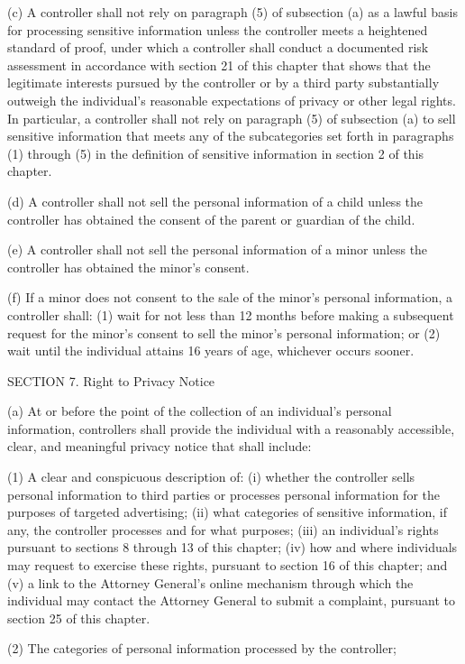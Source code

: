(c) A controller shall not rely on paragraph (5) of subsection (a) as a lawful basis for processing sensitive information unless the controller meets a heightened standard of proof, under which a controller shall conduct a documented risk assessment in accordance with section 21 of this chapter that shows that the legitimate interests pursued by the controller or by a third party substantially outweigh the individual’s reasonable expectations of privacy or other legal rights. In particular, a controller shall not rely on paragraph (5) of subsection (a) to sell sensitive information that meets any of the subcategories set forth in paragraphs (1) through (5) in the definition of sensitive information in section 2 of this chapter.  

(d) A controller shall not sell the personal information of a child unless the controller has obtained the consent of the parent or guardian of the child.

(e) A controller shall not sell the personal information of a minor unless the controller has obtained the minor’s consent.

(f) If a minor does not consent to the sale of the minor’s personal information, a controller shall: (1) wait for not less than 12 months before making a subsequent request for the minor’s consent to sell the minor’s personal information; or (2) wait until the individual attains 16 years of age, whichever occurs sooner.

SECTION 7. Right to Privacy Notice

(a) At or before the point of the collection of an individual’s personal information, controllers shall provide the individual with a reasonably accessible, clear, and meaningful privacy notice that shall include:

(1) A clear and conspicuous description of: (i) whether the controller sells personal information to third parties or processes personal information for the purposes of targeted advertising; (ii) what categories of sensitive information, if any, the controller processes and for what purposes; (iii) an individual’s rights pursuant to sections 8 through 13 of this chapter; (iv) how and where individuals may request to exercise these rights, pursuant to section 16 of this chapter; and (v) a link to the Attorney General’s online mechanism through which the individual may contact the Attorney General to submit a complaint, pursuant to section 25 of this chapter.

(2) The categories of personal information processed by the controller;

